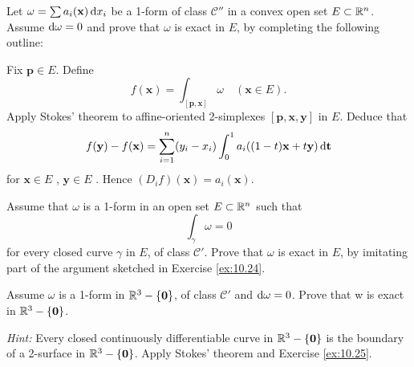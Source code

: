 \begin{myexercise}
    \label{ex:10.24}
    Let $\omega = \sum a_i(\mathbf{x}) \d x_i$ be a 1-form of class $\mathscr{C}''$ in a convex open set $E \subset {\protect\mathbb R}^n$.
    Assume $\d \omega = 0$ and prove that $\omega$ is exact in $E$, by completing the following outline:

    Fix $\mathbf{p} \in E$.
    Define
    \begin{equation*}
        f(\mathbf{x}) = \int_{[\mathbf{p,x}]} \omega
        \quad
        (\mathbf{x} \in E).
    \end{equation*}
    Apply Stokes' theorem to affine-oriented 2-simplexes $[\mathbf{p, x, y}]$ in $E$.
    Deduce that
    \begin{equation*}
        f(\mathbf{y}) -
        f(\mathbf{x}) =
        \sum_{i=1}^{n} (y_i-x_i)
        \int_{0}^{1} a_i ((1-t)\mathbf{x}+t\mathbf{y}) \d \mathbf{t}
    \end{equation*}
    for
    $\mathbf{x} \in E$ ,
    $\mathbf{y} \in E$ .
    Hence $(D_i f)(\mathbf{x}) = a_i(\mathbf{x})$.
\end{myexercise}


\begin{myexercise}
    \label{ex:10.25}
    Assume that $\omega$ is a 1-form in an open set $E \subset {\protect\mathbb R}^n$ such that
    \begin{equation*}
        \int_{\gamma} \omega = 0
    \end{equation*}
    for every closed curve $\gamma$ in $E$, of class $\mathscr{C}'$.
    Prove that $\omega$ is exact in $E$, by imitating part of the argument sketched in Exercise \ref{ex:10.24}.
\end{myexercise}


\begin{myexercise}
    \label{ex:10.26}
    Assume $\omega$ is a 1-form in ${\protect\mathbb R}^3-\{\mathbf{0}\}$, of class $\mathscr{C}'$ and $\d \omega =0$.
    Prove that w is exact in ${\protect\mathbb R}^3-\{\mathbf{0}\}$.

    \emph{Hint:} Every closed continuously differentiable curve in ${\protect\mathbb R}^3-\{\mathbf{0}\}$ is the boundary of a 2-surface in ${\protect\mathbb R}^3-\{\mathbf{0}\}$.
    Apply Stokes' theorem and Exercise \ref{ex:10.25}.
\end{myexercise}


